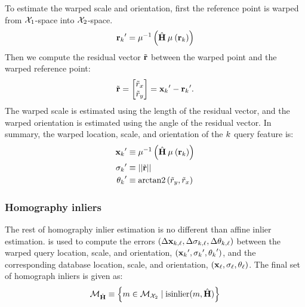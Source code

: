         To estimate the warped scale and orientation, first the reference
          point is warped from $\mathcal{X}_{1}$-space into $\mathcal{X}_{2}$-space.
        \begin{equation}
            {{\ensuremath{\mathbf{r}}_{k}}}' = \mathbin{\mu^{-1}}\left(\hat{\mathbf{H}} \mathbin{\mu}\left({\mathbf{r}_{k}}\right)\right)
        \end{equation}
        Then we compute the residual vector $\tilde{\mathbf{r}}$ between the warped point
          and the warped reference point:
        \begin{equation}
            \tilde{\mathbf{r}} = \begin{bmatrix} \tilde{r}_x \\ \tilde{r}_y \end{bmatrix} = {{\mathbf{x}_{k}}}'- {{\mathbf{r}_{k}}}'.
        \end{equation}
        The warped scale is estimated using the length of the residual
          vector, and the warped orientation is estimated using the angle
          of the residual vector.
        In summary, the warped location, scale, and orientation of the
          $k$\th{} query feature is:
        \begin{equation}\label{eqn:homogwarp}
            \begin{aligned}
                {{\ensuremath{\mathbf{x}}_{k}}}'      &\equiv \mathbin{\mu^{-1}}\left(\hat{\mathbf{H}} \mathbin{\mu}\left({\mathbf{r}_{k}}\right)\right) \\
                 {{\sigma_{k}}}'  &\equiv ||\tilde{\mathbf{r}}||_{}\\
                {{\theta_{k}}}'     &\equiv \mathbin{\operatorname{arctan2}}\left(\tilde{r}_y, \tilde{r}_x\right)
            \end{aligned}
        \end{equation}

        \subsubsection{Homography inliers}
        The rest of homography inlier estimation is no different than
          affine inlier estimation.
         is used to compute the errors $( %
        \Delta \pt_{\idxI, \idxII}, %
        \Delta \scale_{\idxI, \idxII}, %
        \Delta \ori_{\idxI, \idxII})$
        between the warped query location, scale, and orientation,
          $({{\mathbf{x}_{k}}}', {{\sigma_{k}}}', {{\theta_{k}}}')$, %
        and the corresponding database location, scale, and
          orientation, %
        $({{\mathbf{x}_{\ell}}}, {{\sigma_{\ell}}}, {{\theta_{\ell}}})$.
        The final set of homograph inliers is given as:
        \begin{equation}\label{eqn:homoginliers}
            \mathcal{M}_{\hat{\mathbf{H}}} \equiv \left\{m  \in \mathcal{M}_{\mathcal{X}_{2}} \mid \operatorname{isinlier}(m, \hat{\mathbf{H}})\right\}
        \end{equation}

